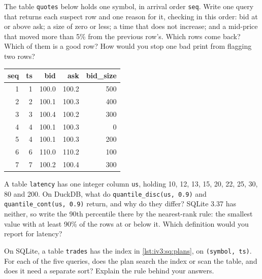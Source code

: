 \begin{question}\label{iq:iv3:sql-and-data:15}
The table \texttt{quotes} below holds one symbol, in arrival order \texttt{seq}. Write one query that returns each suspect row and one reason for it, checking in this order: bid at or above ask; a size of zero or less; a time that does not increase; and a mid-price that moved more than 5\% from the previous row's. Which rows come back? Which of them is a good row? How would you stop one bad print from flagging two rows?
\begin{center}\small
\begin{tabular}{rrrrr}
seq & ts & bid & ask & bid\_size\\\hline
1 & 1 & 100.0 & 100.2 & 500\\
2 & 2 & 100.1 & 100.3 & 400\\
3 & 3 & 100.4 & 100.2 & 300\\
4 & 4 & 100.1 & 100.3 & 0\\
5 & 4 & 100.1 & 100.3 & 200\\
6 & 6 & 110.0 & 110.2 & 100\\
7 & 7 & 100.2 & 100.4 & 300
\end{tabular}
\end{center}
\end{question}

\begin{question}\label{iq:iv3:sql-and-data:16}
A table \texttt{latency} has one integer column \texttt{us}, holding 10, 12, 13, 15, 20, 22, 25, 30, 80 and 200. On DuckDB, what do \texttt{quantile\_disc(us, 0.9)} and \texttt{quantile\_cont(us, 0.9)} return, and why do they differ? SQLite 3.37 has neither, so write the 90th percentile there by the nearest-rank rule: the smallest value with at least 90\% of the rows at or below it. Which definition would you report for latency?
\end{question}

\begin{question}\label{iq:iv3:sql-and-data:17}
On SQLite, a table \texttt{trades} has the index in \cref{lst:iv3:sq:plans}, on \texttt{(symbol, ts)}. For each of the five queries, does the plan search the index or scan the table, and does it need a separate sort? Explain the rule behind your answers.
\label{lst:iv3:sq:plans}
\end{question}

